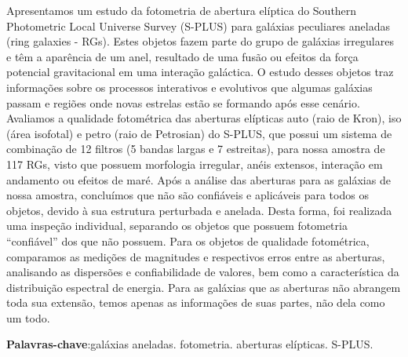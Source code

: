 \setlength{\absparsep}{18pt} %
\begin{resumo}
 
Apresentamos um estudo da fotometria de abertura elíptica do Southern Photometric Local Universe Survey (S-PLUS) para galáxias peculiares aneladas (ring galaxies - RGs). Estes objetos fazem parte do grupo de galáxias irregulares e têm a aparência de um anel, resultado de uma fusão ou efeitos da força potencial gravitacional em uma interação galáctica. O estudo desses objetos traz informações sobre os processos interativos e evolutivos que algumas galáxias passam e regiões onde novas estrelas estão se formando após esse cenário. Avaliamos a qualidade fotométrica das aberturas elípticas auto (raio de Kron), iso (área isofotal) e petro (raio de Petrosian) do S-PLUS, que possui um sistema de combinação de 12 filtros (5 bandas largas e 7 estreitas), para nossa amostra de 117 RGs, visto que possuem morfologia irregular, anéis extensos, interação em andamento ou efeitos de maré. Após a análise das aberturas para as galáxias de nossa amostra, concluímos que não são confiáveis e aplicáveis para todos os objetos, devido à sua estrutura perturbada e anelada. Desta forma, foi realizada uma inspeção individual, separando os objetos que possuem fotometria ``confiável'' dos que não possuem. Para os objetos de qualidade fotométrica, comparamos as medições de magnitudes e respectivos erros entre as aberturas, analisando as dispersões e confiabilidade de valores, bem como a característica da distribuição espectral de energia. Para as galáxias que as aberturas não abrangem toda sua extensão, temos apenas as informações de suas partes, não dela como um todo.

 \textbf{Palavras-chave}:galáxias aneladas. fotometria. aberturas elípticas. S-PLUS.
\end{resumo}